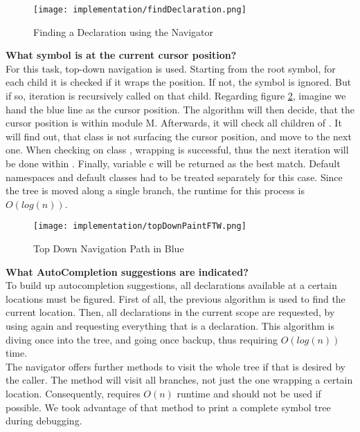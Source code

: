 \begin{figure}[H]
    \centering
    \texttt{[image: implementation/findDeclaration.png]}
    \caption{Finding a Declaration using the Navigator}
    \label{fig:findDecl}
\end{figure}

\textbf{What symbol is at the current cursor position?}\\
For this task, top-down navigation is used.
Starting from the root symbol, for each child it is checked if it wraps the position.
If not, the symbol is ignored.
But if so, iteration is recursively called on that child.
Regarding figure \ref{fig:topDownPaintFTW}, imagine we hand the blue line as the cursor position.
The algorithm will then decide, that the cursor position is within module M.
Afterwards, it will check all children of .
It will find out, that class  is not surfacing the cursor position, and move to the next one.
When checking on class , wrapping is successful, thus the next iteration will be done within .
Finally, variable c will be returned as the best match.
Default namespaces and default classes had to be treated separately for this case.
Since the tree is moved along a single branch, the runtime for this process is $O(log(n))$.\\

\begin{figure}[H]
    \centering
    \texttt{[image: implementation/topDownPaintFTW.png]}
    \caption{Top Down Navigation Path in Blue}
    \label{fig:topDownPaintFTW}
\end{figure}

\textbf{What AutoCompletion suggestions are indicated?}\\
To build up autocompletion suggestions, all declarations available at a certain locations must be figured.
First of all, the previous  algorithm is used to find the current location.
Then, all declarations in the current scope are requested, by using  again and requesting everything that is a declaration.
This algorithm is diving once into the tree, and going once backup, thus requiring $O(log(n))$ time.\\

The navigator offers further methods to visit the whole tree if that is desired by the caller.
The method  will visit all branches, not just the one wrapping a certain location.
Consequently,  requires $O(n)$ runtime and should not be used if possible.
We took advantage of that method to print a complete symbol tree during debugging.

